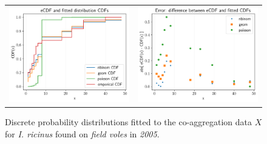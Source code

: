 \documentclass{article}
\begin{document}
\begin{figure}[]
	\begin{mdframed}[backgroundcolor=grey250,rightline=false,leftline=false,topline=false]
	\centering
	\begin{tabular}{ll}
		\includegraphics[width=.48\linewidth,valign=m]{CDF_compare_2005_I.ricinus_FV} & \includegraphics[width=.48\linewidth,valign=m]{CDF_errors_2005_I.ricinus_FV}
	\end{tabular}
	\caption{Discrete probability distributions fitted to the co-aggregation data $ X $ for \textit{I. ricinus} found on \textit{field voles} in \textit{2005}.}
	\label{fig:CDF_2005_iricnus_FV}
	\end{mdframed}
\end{figure}
\end{document}
